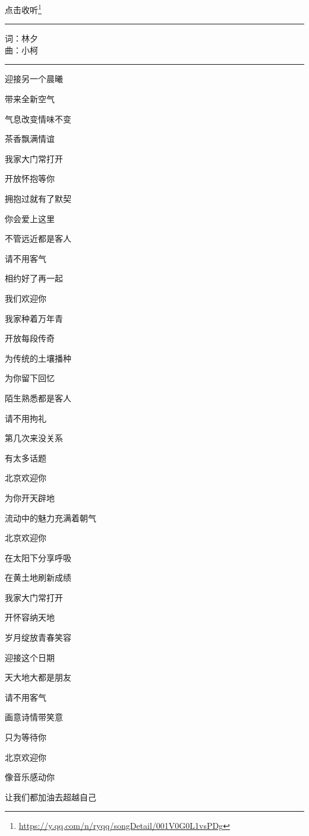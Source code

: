 \documentclass[]{ctexbook}
\renewcommand{\href}[2]{#2\footnote{\url{#1}}}
\begin{document}
\href{https://y.qq.com/n/ryqq/songDetail/001V0G0L1vsPDg}{点击收听}

\begin{center}\rule{0.5\linewidth}{0.5pt}\end{center}

词：林夕\\
曲：小柯

\begin{center}\rule{0.5\linewidth}{0.5pt}\end{center}

迎接另一个晨曦

带来全新空气

气息改变情味不变

茶香飘满情谊

我家大门常打开

开放怀抱等你

拥抱过就有了默契

你会爱上这里

不管远近都是客人

请不用客气

相约好了再一起

我们欢迎你

我家种着万年青

开放每段传奇

为传统的土壤播种

为你留下回忆

陌生熟悉都是客人

请不用拘礼

第几次来没关系

有太多话题

北京欢迎你

为你开天辟地

流动中的魅力充满着朝气

北京欢迎你

在太阳下分享呼吸

在黄土地刷新成绩

我家大门常打开

开怀容纳天地

岁月绽放青春笑容

迎接这个日期

天大地大都是朋友

请不用客气

画意诗情带笑意

只为等待你

北京欢迎你

像音乐感动你

让我们都加油去超越自己
\end{document}
